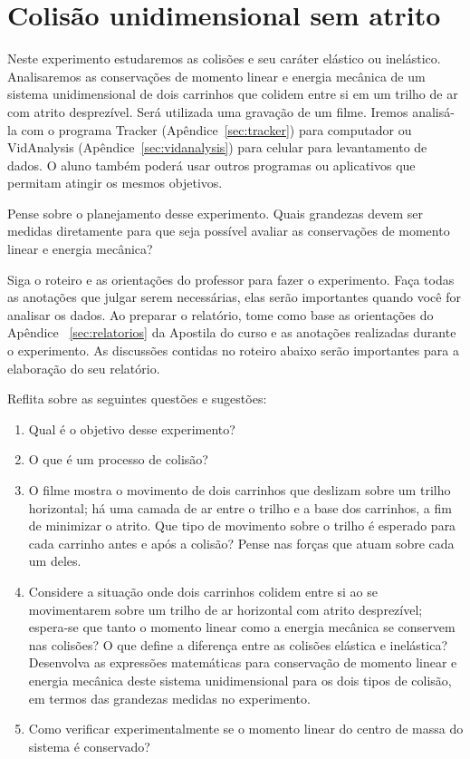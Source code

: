 \section{Colisão unidimensional sem atrito}

Neste experimento estudaremos as colisões e seu caráter elástico ou inelástico. Analisaremos as conservações de momento linear e energia mecânica de um sistema unidimensional de dois carrinhos que colidem entre si em um trilho de ar com atrito desprezível. Será utilizada uma gravação de um filme. Iremos analisá-la com o programa Tracker (Apêndice~\ref{sec:tracker}) para computador ou VidAnalysis (Apêndice~\ref{sec:vidanalysis}) para celular para levantamento de dados. O aluno também poderá usar outros programas ou aplicativos que permitam atingir os mesmos objetivos.

Pense sobre o planejamento desse experimento. Quais grandezas devem ser medidas diretamente para que seja possível avaliar as conservações de momento linear e energia mecânica? 

Siga o roteiro e as orientações do professor para fazer o experimento. Faça todas as anotações que julgar serem necessárias, elas serão importantes quando você for analisar os dados. Ao preparar o relatório,  tome como base as orientações do Apêndice ~\ref{sec:relatorios}  da Apostila do curso e as anotações realizadas durante o experimento. As discussões contidas no roteiro abaixo serão importantes para a elaboração do seu relatório.



Reflita sobre as seguintes questões e sugestões:

\begin{enumerate}
\item Qual é o objetivo desse experimento?
\item O que é um processo de colisão?
\item O filme mostra o movimento de dois carrinhos que deslizam sobre um trilho horizontal; há uma camada de ar entre o trilho e a base dos carrinhos, a fim de minimizar o atrito. Que tipo de movimento sobre o trilho é esperado para cada carrinho  antes e após a colisão? Pense nas forças que atuam sobre cada um deles.
\item  Considere a situação onde dois carrinhos colidem entre si ao se movimentarem sobre um trilho de ar horizontal com atrito desprezível; espera-se que tanto o momento linear como a energia mecânica se conservem nas colisões? O que define a diferença entre as colisões elástica e inelástica? Desenvolva as expressões matemáticas para conservação de momento linear e energia mecânica deste sistema unidimensional para os dois tipos de colisão, em termos das grandezas medidas no experimento. 
\item Como verificar experimentalmente se o momento linear do centro de massa do sistema é conservado?
\end{enumerate}

